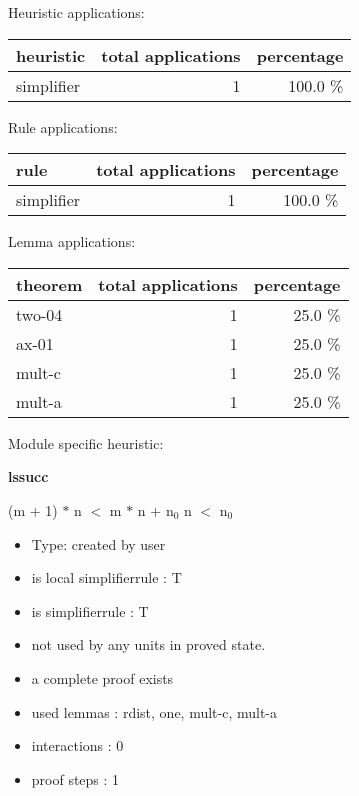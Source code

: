 \documentclass[a4paper]{article}
\begin{document}
\medskip


Heuristic applications:

\begin{supertabular}{l|r|r}
heuristic	& total applications & percentage \\ \hline
simplifier & 1 & 100.0 \% \\

\end{supertabular}

Rule applications:

\begin{supertabular}{l|r|r}
rule	        & total applications & percentage \\ \hline
simplifier & 1 & 100.0 \% \\

\end{supertabular}

Lemma applications:

\begin{supertabular}{l|r|r}
theorem	        & total applications & percentage \\ \hline
two-04 & 1 & 25.0 \% \\
ax-01 & 1 & 25.0 \% \\
mult-c & 1 & 25.0 \% \\
mult-a & 1 & 25.0 \% \\

\end{supertabular}

Module specific heuristic:

\pagebreak

{\LARGE\bf lssucc}\label{lemma-lssucc}

\medskip

 \Fol (m + 1) $*$ n $<$ m $*$ n + $\mbox{n}_{0}$ \Equiv n $<$ $\mbox{n}_{0}$

\begin{itemize}

\item Type: created by user

\item is local simplifierrule : T
\item is simplifierrule : T
\item not used by any units in proved state.
\item       a complete proof exists
\item       used lemmas  : rdist, one, mult-c, mult-a
\item       interactions : 0
\item       proof steps  : 1
\end{itemize}
\end{document}
